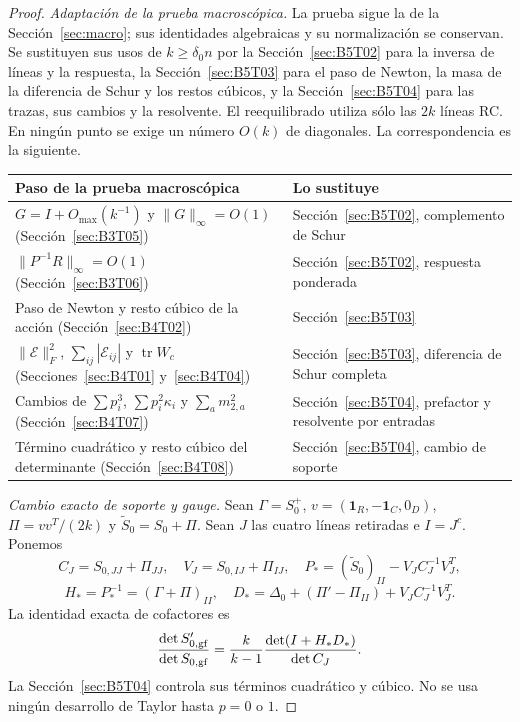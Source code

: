 \begin{proof}
\emph{Adaptación de la prueba macroscópica.}
La prueba sigue la de la Sección~\ref{sec:macro}; sus identidades algebraicas y su normalización se
conservan. Se sustituyen sus usos de $k\ge\delta_0n$ por la Sección~\ref{sec:B5T02} para la inversa de
líneas y la respuesta, la Sección~\ref{sec:B5T03} para el paso de Newton, la masa de la diferencia de
Schur y los restos cúbicos, y la Sección~\ref{sec:B5T04} para las trazas, sus cambios y la resolvente.
El reequilibrado utiliza sólo las $2k$ líneas RC.
En ningún punto se exige un número $O(k)$ de diagonales. La correspondencia es la siguiente.
\begin{center}
\renewcommand{\arraystretch}{1.25}
\begin{tabular}{@{}>{\raggedright\arraybackslash}p{}
                >{\raggedright\arraybackslash}p{}@{}}
\toprule
Paso de la prueba macroscópica & Lo sustituye\\
\midrule
$G=I+O_{\max}(k^{-1})$ y $\|G\|_\infty=O(1)$ (Sección~\ref{sec:B3T05}) &
 Sección~\ref{sec:B5T02}, complemento de Schur\\
$\|P^{-1}R\|_\infty=O(1)$ (Sección~\ref{sec:B3T06}) &
 Sección~\ref{sec:B5T02}, respuesta ponderada\\
Paso de Newton y resto cúbico de la acción (Sección~\ref{sec:B4T02}) &
 Sección~\ref{sec:B5T03}\\
$\|\mathcal E\|_F^2$, $\sum_{ij}|\mathcal E_{ij}|$ y $\operatorname{tr}W_c$
 (Secciones~\ref{sec:B4T01} y~\ref{sec:B4T04}) &
 Sección~\ref{sec:B5T03}, diferencia de Schur completa\\
Cambios de $\sum p_i^3$, $\sum p_i^2\kappa_i$ y $\sum_am_{2,a}^2$ (Sección~\ref{sec:B4T07}) &
 Sección~\ref{sec:B5T04}, prefactor y resolvente por entradas\\
Término cuadrático y resto cúbico del determinante (Sección~\ref{sec:B4T08}) &
 Sección~\ref{sec:B5T04}, cambio de soporte\\
\bottomrule
\end{tabular}
\end{center}

\par\emph{Cambio exacto de soporte y gauge.}
Sean $\Gamma=S_0^+$, $v=(\mathbf1_R,-\mathbf1_C,0_D)$,
$\Pi=vv^T/(2k)$ y $\widetilde S_0=S_0+\Pi$.
Sean $J$ las cuatro líneas retiradas e $I=J^c$. Ponemos
\[
 C_J=S_{0,JJ}+\Pi_{JJ},\quad V_J=S_{0,IJ}+\Pi_{IJ},
 \quad P_*=(\widetilde S_0)_{II}-V_JC_J^{-1}V_J^T,
\]
\[
 H_*=P_*^{-1}=(\Gamma+\Pi)_{II},\quad
 D_*=\Delta_0+(\Pi'-\Pi_{II})+V_JC_J^{-1}V_J^T.
\]
La identidad exacta de cofactores es
\[
 \frac{\det S'_{0,\rm gf}}{\det S_{0,\rm gf}}
 =\frac{k}{k-1}\frac{\det(I+H_*D_*)}{\det C_J}.
\]
La Sección~\ref{sec:B5T04} controla sus términos cuadrático y cúbico. No se usa ningún desarrollo
de Taylor hasta $p=0$ o $1$.


\end{proof}
